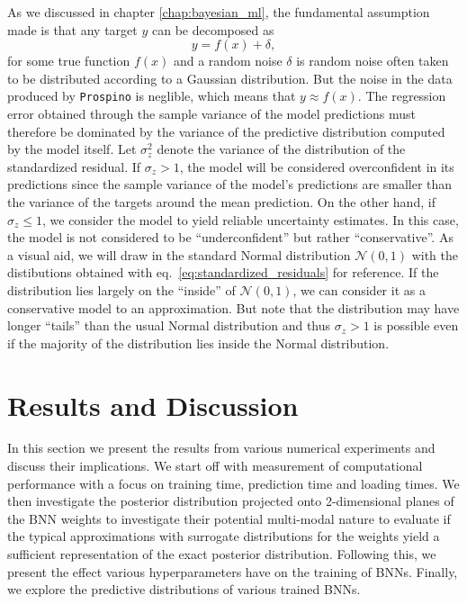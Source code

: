 As we discussed in chapter \ref{chap:bayesian_ml}, the fundamental assumption made is that any target $y$ can be decomposed as
\begin{equation}
    y = f(x) + \delta,
\end{equation}
for some true function $f(x)$ and a random noise $\delta$ is random noise often taken to be distributed according to a Gaussian distribution. But the noise in the data produced by \texttt{Prospino} is neglible, which means that $y \approx f(x)$. The regression error obtained through the sample variance of the model predictions must therefore be dominated by the variance of the predictive distribution computed by the model itself. Let $\sigma_z^2$ denote the variance of the distribution of the standardized residual. If $\sigma_z > 1$, the model will be considered overconfident in its predictions since the sample variance of the model's predictions are smaller than the variance of the targets around the mean prediction. On the other hand, if $\sigma_z \leq 1$, we consider the model to yield reliable uncertainty estimates. In this case, the model is not considered to be ``underconfident'' but rather ``conservative''. As a visual aid, we will draw in the standard Normal distribution $\mathcal{N}(0, 1)$ with the distibutions obtained with eq.~\eqref{eq:standardized_residuals} for reference. If the distribution lies largely on the ``inside'' of $\mathcal{N}(0, 1)$, we can consider it as a conservative model to an approximation. But note that the distribution may have longer ``tails'' than the usual Normal distribution and thus 
$\sigma_z > 1$ is possible even if the majority of the distribution lies inside the Normal distribution.

\section{Results and Discussion}\label{sec:results}
In this section we present the results from various numerical experiments and discuss their implications. We start off with measurement of computational performance with a focus on training time, prediction time and loading times. We then investigate the posterior distribution projected onto 2-dimensional planes of the BNN weights to investigate their potential multi-modal nature to evaluate if the typical approximations with surrogate distributions for the weights yield a sufficient representation of the exact posterior distribution. Following this, we present the effect various hyperparameters have on the training of BNNs. Finally, we explore the predictive distributions of various trained BNNs.

